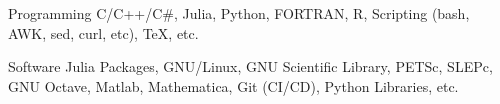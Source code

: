 
\begin{cvskills}

	\cvskill
	{Programming}
    {C/C++/C\#, Julia, Python, FORTRAN, R, Scripting (bash, AWK, sed, curl, etc), \TeX, etc.}

	\cvskill
	{Software}
    {Julia Packages, GNU/Linux, GNU Scientific Library, PETSc, SLEPc, GNU Octave, Matlab, Mathematica, Git (CI/CD), Python Libraries, etc.}

\end{cvskills}

